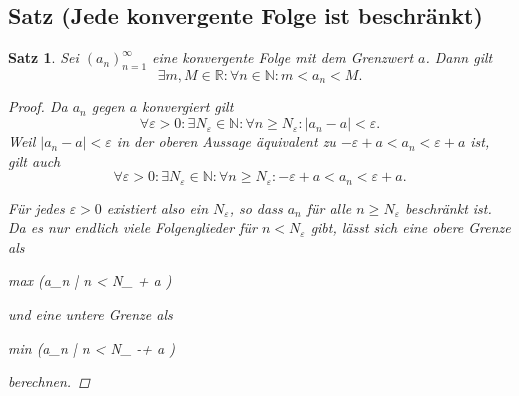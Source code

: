 \documentclass{article}
\newtheorem{thm}{Satz}[section]
\newenvironment{aleq*}{\begin{equation*}\begin{aligned}}{\end{aligned}\end{equation*}}
\begin{document}
	\subsection{Satz (Jede konvergente Folge ist beschränkt)}
	\begin{thm}
		\label{konvergentBeschraenkt}
		Sei \((a_n)_{n=1}^{\infty}\) eine konvergente Folge mit dem Grenzwert \(a\). Dann gilt
		\[
		\exists m,M \in \mathbb{R} \colon \forall n \in \mathbb{N} \colon m < a_n < M \text{.}
		\]
		
		\begin{proof}
			Da \(a_n\) gegen \(a\) konvergiert gilt
		\[
		\forall \varepsilon>0 \colon \exists N_{\varepsilon} \in \mathbb{N} \colon \forall n \geq N_{\varepsilon} \colon |a_n - a| < \varepsilon \text{.}
		\]
		Weil \(|a_n - a| < \varepsilon\) in der oberen Aussage äquivalent zu \(-\varepsilon + a < a_n < \varepsilon + a\) ist, gilt auch
		\[
		\forall \varepsilon>0 \colon \exists N_{\varepsilon} \in \mathbb{N} \colon \forall n \geq N_{\varepsilon} \colon -\varepsilon + a < a_n < \varepsilon + a \text{.}
		\]
		\par
		Für jedes \(\varepsilon > 0\) existiert also ein \(N_{\varepsilon}\), so dass \(a_n\) für alle \(n \geq N_{\varepsilon}\) beschränkt ist. Da es nur endlich viele Folgenglieder für \(n < N_{\varepsilon}\) gibt, lässt sich eine obere Grenze als 
		\begin{aleq*}
			max (\left\lbrace a_n | n < N_{\varepsilon} \right\rbrace  \cup \lbrace \varepsilon + a \rbrace)
		\end{aleq*}

		 und eine untere Grenze als 
		 \begin{aleq*}
		 	min (\left\lbrace a_n | n < N_{\varepsilon} \rbrace \cup \lbrace -\varepsilon + a \rbrace\right\rbrace)
		 \end{aleq*}

		  berechnen.
		\end{proof}
	\end{thm}
	
\end{document}
